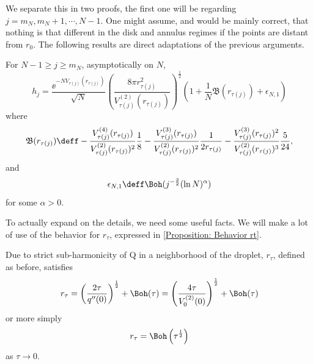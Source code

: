 We separate this in two proofs, the first one will be regarding $j = m_N, m_N + 1, \cdots, N-1$. One might assume, and would be mainly correct, that nothing is that different in the disk and annulus regimes if the points are distant from $r_0$. The following results are direct adaptations of the previous arguments. 

\begin{teorema}	\label{Theorem: hj disk j>mn}
	For $N-1 \geq j \geq m_N$, asymptotically on $N$,
	\begin{equation}
		h_j =  \frac{\ee^{-N V_{\tau(j)}(r_{\tau(j)})}}{\sqrt{N}} \left( \frac{8\pi r^2_{\tau(j)}}{V^{(2)}_{\tau(j)}(r_{\tau(j)})} \right)^{\frac{1}{2}} \left( 1 + \frac{1}{N} \mathfrak{B}(r_{\tau(j)}) + \epsilon_{N, 1} \right) 
	\end{equation}
	where 
	\begin{equation}
		\mathfrak{B}(r_{\tau(j)}) \deff -\frac{V^{(4)}_{\tau(j)}(r_{\tau(j)})}{V^{(2)}_{\tau(j)}(r_{\tau(j)})^2} \frac{1}{8} - \frac{V^{(3)}_{\tau(j)}(r_{\tau(j)})}{V^{(2)}_{\tau(j)}(r_{\tau(j)})^{2}} \frac{1}{2 r_{\tau(j)}} - \frac{V^{(3)}_{\tau(j)}(r_{\tau(j)})^2}{V^{(2)}_{\tau(j)}(r_{\tau(j)})^{3}} \frac{5}{24},
	\end{equation}
	and
	\begin{equation}
		\epsilon_{N, 1} \deff  \Boh(j^{-\frac{3}{2}} (\ln N)^\alpha)
	\end{equation}
	for some $\alpha > 0$.
\end{teorema}

To actually expand on the details, we need some useful facts. We will make a lot of use of the behavior for $r_\tau$, expressed in \autoref{Proposition: Behavior rt}.

\begin{proposicao} 	\label{Proposition: Behavior rt}
	Due to strict sub-harmonicity of Q in a neighborhood of the droplet, $r_\tau$, defined as before, satisfies 
	\begin{equation}
		r_\tau = \left( \frac{2\tau}{q''(0)} \right)^{\frac{1}{2}} + \Boh(\tau) = \left( \frac{4\tau}{V^{(2)}_0(0)} \right)^{\frac{1}{2}} + \Boh(\tau) 
	\end{equation}
	or more simply
	\begin{equation}
		r_\tau = \Boh \left(\tau^{\frac{1}{2}}\right)
	\end{equation}
	as $\tau \rightarrow 0$.
\end{proposicao}

